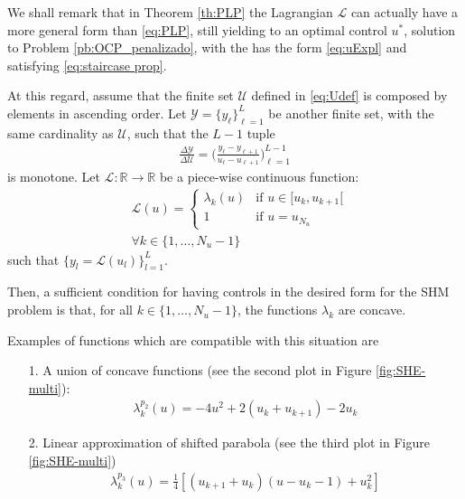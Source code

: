 \documentclass[twocolumn]{autart}    %
\begin{document}
\begin{remark}

We shall remark that in Theorem \ref{th:PLP} the Lagrangian $\mathcal L$ can actually have a more general form than \eqref{eq:PLP}, still yielding to an optimal control $u^\ast$, solution to Problem \ref{pb:OCP_penalizado}, with the has the form \eqref{eq:uExpl} and satisfying \eqref{eq:staircase prop}.

At this regard, assume that the finite set $\mathcal{U}$ defined in \eqref{eq:Udef} is composed by elements in ascending order. Let $\mathcal{Y} = \{y_\ell\}_{\ell=1}^L$ be another finite set, with the same cardinality as $\mathcal U$, such that the $L-1$ tuple
\begin{align*}
	\frac{\Delta \mathcal{Y}}{\Delta \mathcal{U}} = \Bigg( \frac{y_\ell - y_{\ell+1}}{u_\ell - u_{\ell+1}} \Bigg)_{\ell=1}^{L-1}
\end{align*}
is monotone. Let $\mathcal{L}:\mathbb{R} \rightarrow \mathbb{R}$ be a piece-wise continuous function:
\begin{align*}
	&\mathcal{L}(u) = \begin{cases}
		\lambda_k(u) & \text{if }  u \in [u_k,u_{k+1}[ \\ 1 & \text{if } u = u_{N_u} 
    \end{cases} 
	\\[10pt]
	&\forall k \in \{1,\dots,N_u-1\}
\end{align*}    
such that $\{y_l = \mathcal{L}(u_l)\}_{l=1}^L$. 

Then, a sufficient condition for having controls in the desired form for the SHM problem is that, for all $k \in \{1,\dots,N_u-1\}$, the functions $\lambda_k$ are concave.

Examples of functions which are compatible with this situation are
\begin{enumerate}
    \item[1.] A union of concave functions (see the second plot in Figure \ref{fig:SHE-multi}):
    \begin{align*}
        \lambda_k^{p_2}(u) = -4u^2 + 2(u_k + u_{k+1}) - 2u_{k}
    \end{align*}
    \item[2.] Linear approximation of shifted parabola (see the third plot in Figure \ref{fig:SHE-multi})
    \begin{align*}
        \lambda_k^{p_3}(u) = \frac 1 4[(u_{k+1}+u_{k}) (u-u_k-1) + u_k^2]
    \end{align*}
\end{enumerate}


\end{remark}
\end{document}
